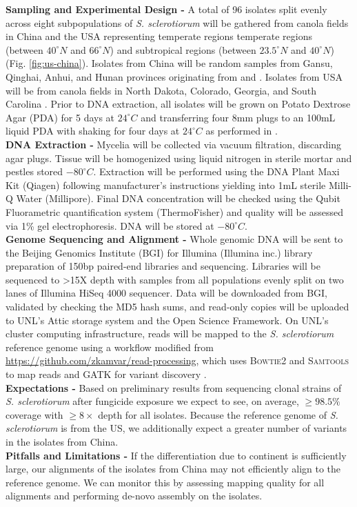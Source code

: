 \documentclass[12pt,letterpaper]{article}
\begin{document}
\noindent \textbf{Sampling and Experimental Design -}
A total of 96 isolates split evenly across eight subpopulations of \textit{S. sclerotiorum} will be gathered from canola fields in China and the USA representing temperate regions temperate regions (between $40^{\circ}N$ and $66^{\circ}N$) and subtropical regions (between $23.5^{\circ}N$ and $40^{\circ}N$) (Fig. \ref{fig:us-china}).
Isolates from China will be random samples from Gansu, Qinghai, Anhui, and Hunan provinces originating from \citet{zhou2014dimethachlon} and \citet{attanayake2013sclerotinia}.
Isolates from USA will be from canola fields in North Dakota, Colorado, Georgia, and South Carolina \citep{aldrich-wolfe2015genetic,phillips2002phylogeography}.
Prior to DNA extraction, all isolates will be grown on Potato Dextrose Agar (PDA) for 5 days at $24^{\circ}C$ and transferring four 8mm plugs to an 100mL liquid PDA with shaking for four days at $24^{\circ}C$ as performed in \citet{derbyshire2017complete}.\\
\noindent \textbf{DNA Extraction -}
Mycelia will be collected via vacuum filtration, discarding agar plugs. Tissue will be homogenized using liquid nitrogen in sterile mortar and pestles stored $-80^{\circ}C$. Extraction will be performed using the DNA Plant Maxi Kit (Qiagen) following manufacturer's instructions yielding into 1mL sterile Milli-Q Water (Millipore). Final DNA concentration will be checked using the Qubit Fluorametric quantification system (ThermoFisher) and quality will be assessed via 1\% gel electrophoresis. DNA will be stored at $-80^{\circ}C$.\\
\noindent \textbf{Genome Sequencing and Alignment -} 
Whole genomic DNA will be sent to the Beijing Genomics Institute (BGI) for Illumina (Illumina inc.) library preparation of 150bp paired-end libraries and sequencing. Libraries will be sequenced to >15X depth with samples from all populations evenly split on two lanes of Illumina HiSeq 4000 sequencer.
Data will be downloaded from BGI, validated by checking the MD5 hash sums, and read-only copies will be uploaded to UNL's Attic storage system and the Open Science Framework. 
On UNL's cluster computing infrastructure, reads will be mapped to the \textit{S. sclerotiorum} reference genome using a workflow modified from \url{https://github.com/zkamvar/read-processing}, which uses \textsc{Bowtie2} and \textsc{Samtools} to map reads and \textsc{GATK} for variant discovery \citep{langmead2012fast, li2009sequence, mckenna2010genome, derbyshire2017complete}.\\ 
\noindent \textbf{Expectations -}
Based on preliminary results from sequencing clonal strains of \textit{S. sclerotiorum} after fungicide exposure we expect to see, on average, $\geq98.5\%$ coverage with $\geq8\times$ depth for all isolates. Because the reference genome of \textit{S. sclerotiorum} is from the US, we additionally expect a greater number of variants in the isolates from China.\\
\noindent \textbf{Pitfalls and Limitations -}
If the differentiation due to continent is sufficiently large, our alignments of the isolates from China may not efficiently align to the reference genome. 
We can monitor this by assessing mapping quality for all alignments and performing de-novo assembly on the isolates.
\end{document}
